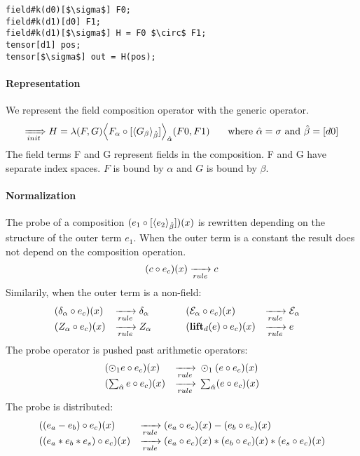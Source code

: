 

\begin{lstlisting}
field#k(d0)[$\sigma$] F0;
field#k(d1)[d0] F1;
field#k(d1)[$\sigma$] H = F0 $\circ$ F1; 
tensor[d1] pos;
tensor[$\sigma$] out = H(pos);
\end{lstlisting}

\paragraph{Representation}
We represent the field composition operator with the generic \name{} operator.
$$\rewriteInitA  H= \lambda(F,G) \EinExp{\expComp{F_\alpha}{G_\beta}{\beta}}{\hat{\alpha}}(F0,F1) \indent\text{ where } \hat{\alpha}=\sigma \text{ and } \hat{\beta} =[d0]$$
The field terms F and G represent fields in the composition.
F and G have separate index spaces. $F$ is bound by $\alpha$ and $G$ is bound by $\beta$.\\
 

\paragraph{Normalization}
The probe of a composition
 $(\expComp{e_1}{e_2}{\beta})(x)$ 
 is rewritten depending on the structure of the outer term $e_1$. 
When the outer term is a constant the result does not depend on the composition operation.
$$(\expCompSingle{ c}{e_2}{\beta})(x) \rewriteRule{} c $$
Similarily, when the outer term is a non-field:
$$\begin{array}{lllllll}
(\expCompSingle{ \delta_{\alpha}}{e_2}{\beta})(x) &\rewriteRule{} \delta_{\alpha}& \indent &
(\expCompSingle{ \mathcal{E}_{\alpha}}{e_2}{\beta})(x) &\rewriteRule{} \mathcal{E}_{\alpha}\\
(\expCompSingle{ Z_{\alpha}}{e_2}{\beta})(x) &\rewriteRule{} Z_{\alpha} &&
(\expCompSingle{ \lift{e}}{e_2}{\beta})(x) &\rewriteRule{} e &
\end{array}$$
The probe operator is pushed past arithmetic operators:
$$\begin{array}{lllll}
(\expCompSingle{\odot_1 e}{e_2}{\beta})(x) &\rewriteRule{} \odot_1 (  \expCompSingle{e}{e_2}{\beta})(x) \\
(\expCompSingle{\sum_{\hat{\alpha}} e}{e_2}{\beta})(x) &\rewriteRule{} \sum_{\hat{\alpha}} (  \expCompSingle{e}{e_2}{\beta})(x) \\
\end{array}$$
The probe is distributed: 
$$\begin{array}{lllll}
(\expCompSingle{(e_a - e_b)}{e_2}{\beta})(x) &\rewriteRule{} (\expCompSingle{e_a}{e_2}{\beta})(x) -(\expCompSingle{e_b}{e_2}{\beta})(x) \\
(\expCompSingle{(e_a * e_b * e_s )}{e_2}{\beta})(x) &\rewriteRule{} (\expCompSingle{e_a}{e_2}{\beta})(x) * (\expCompSingle{e_b}{e_2}{\beta})(x)*(\expCompSingle{e_s}{e_2}{\beta})(x) \end{array}$$



